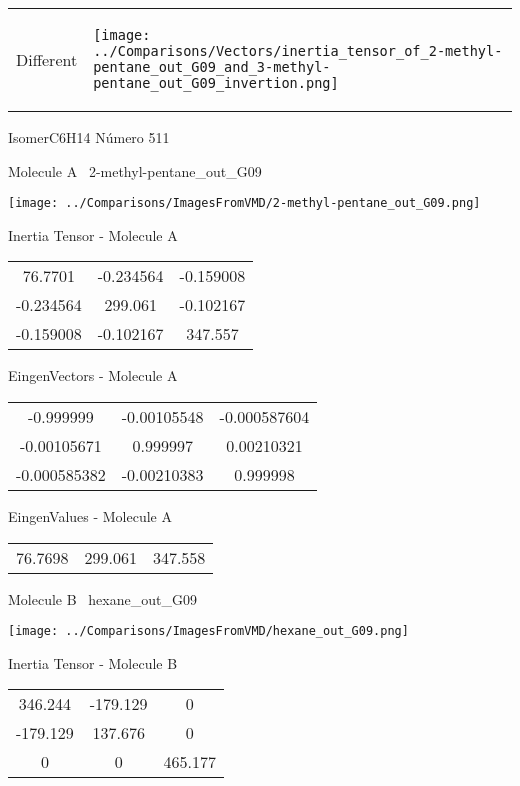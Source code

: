 \vtab[-5mm]
\begin{tabular}{*{2}{m{}}}
\begin{center}
\textcolor{NavyBlue}{\Large Different}
\end{center}
&
\begin{center}
\texttt{[image: ../Comparisons/Vectors/inertia\_tensor\_of\_2-methyl-pentane\_out\_G09\_and\_3-methyl-pentane\_out\_G09\_invertion.png]}
\end{center}
\end{tabular}

 \newpage

\vtab[-3cm]
\begin{center}
{\large IsomerC6H14 \tab Número 511}
\end{center}
\begin{multicols}{2}
\begin{center}

Molecule A \
2-methyl-pentane\_out\_G09

\texttt{[image: ../Comparisons/ImagesFromVMD/2-methyl-pentane\_out\_G09.png]}

Inertia Tensor - Molecule A \\
\begin{tabular}{|c c c|}
76.7701	 & 	-0.234564	 & 	-0.159008	 \\
-0.234564	 & 	299.061	 & 	-0.102167	 \\
-0.159008	 & 	-0.102167	 & 	347.557
\end{tabular}

\vtab
 EingenVectors - Molecule A     \\
\begin{tabular}{|c c c|}
-0.999999	 & 	-0.00105548	 & 	-0.000587604	 \\
-0.00105671	 & 	0.999997	 & 	0.00210321	 \\
-0.000585382	 & 	-0.00210383	 & 	0.999998
\end{tabular}

\vtab
 EingenValues - Molecule A     \\
\begin{tabular}{|c c c|}
76.7698	 & 	299.061	 & 	347.558	 \\
\end{tabular}
\columnbreak

Molecule B \
hexane\_out\_G09

\texttt{[image: ../Comparisons/ImagesFromVMD/hexane\_out\_G09.png]}

Inertia Tensor - Molecule B \\
\begin{tabular}{|c c c|}
346.244	 & 	-179.129	 & 	0	 \\
-179.129	 & 	137.676	 & 	0	 \\
0	 & 	0	 & 	465.177
\end{tabular}


\end{center}
\end{multicols}
